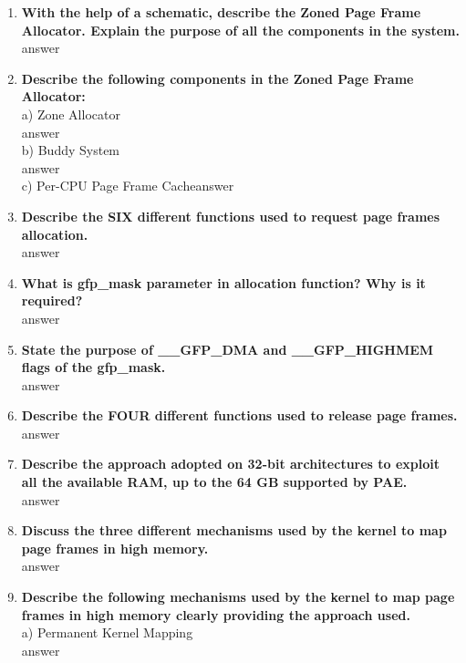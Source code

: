 \documentclass[a4paper,12pt]{article}
\begin{document}
\begin{flushleft}
\begin{enumerate}
\item \textbf{  With the help of a schematic, describe the Zoned Page Frame Allocator. Explain the purpose of all the components in the system.}\\
{\color{red}answer}\\
\item \textbf{ Describe the following components in the Zoned Page Frame Allocator:}\\
a) Zone Allocator \\{\color{red}answer}\\
b) Buddy System \\{\color{red}answer}\\
c) Per-CPU Page Frame Cache{\color{red}answer}\\
\item \textbf{ Describe the SIX different functions used to request page frames allocation.}\\
{\color{red}answer}\\
\item \textbf{ What is gfp\_mask parameter in allocation function? Why is it required?}\\
{\color{red}answer}\\
\item \textbf{ State the purpose of \_\_GFP\_DMA and \_\_GFP\_HIGHMEM flags of the gfp\_mask.}\\
{\color{red}answer}\\
\item \textbf{  Describe the FOUR different functions used to release page frames.}\\
{\color{red}answer}\\
\item \textbf{  Describe the approach adopted on 32-bit architectures to exploit all the available RAM, up to the 64 GB supported by PAE.}\\
{\color{red}answer}\\
\item \textbf{ Discuss the three different mechanisms used by the kernel to map page frames in high memory.}\\
{\color{red}answer}\\
\item \textbf{ Describe the following mechanisms used by the kernel to map page frames in high memory clearly providing the approach used.}\\
a) Permanent Kernel Mapping\\{\color{red}answer}\\

\end{enumerate}
\end{flushleft}
\end{document}
